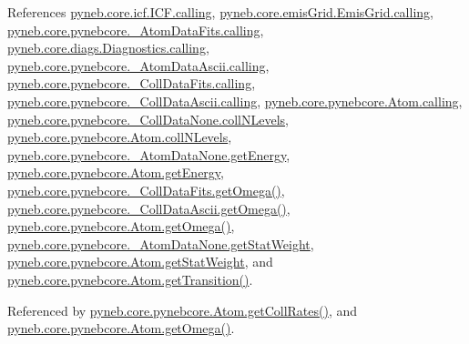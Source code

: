References \hyperlink{icf_8py_source_l00016}{pyneb.\+core.\+icf.\+I\+C\+F.\+calling}, \hyperlink{emis_grid_8py_source_l00041}{pyneb.\+core.\+emis\+Grid.\+Emis\+Grid.\+calling}, \hyperlink{pynebcore_8py_source_l00090}{pyneb.\+core.\+pynebcore.\+\_\+\+Atom\+Data\+Fits.\+calling}, \hyperlink{diags_8py_source_l00169}{pyneb.\+core.\+diags.\+Diagnostics.\+calling}, \hyperlink{pynebcore_8py_source_l00311}{pyneb.\+core.\+pynebcore.\+\_\+\+Atom\+Data\+Ascii.\+calling}, \hyperlink{pynebcore_8py_source_l00568}{pyneb.\+core.\+pynebcore.\+\_\+\+Coll\+Data\+Fits.\+calling}, \hyperlink{pynebcore_8py_source_l00918}{pyneb.\+core.\+pynebcore.\+\_\+\+Coll\+Data\+Ascii.\+calling}, \hyperlink{pynebcore_8py_source_l01175}{pyneb.\+core.\+pynebcore.\+Atom.\+calling}, \hyperlink{pynebcore_8py_source_l00073}{pyneb.\+core.\+pynebcore.\+\_\+\+Coll\+Data\+None.\+coll\+N\+Levels}, \hyperlink{pynebcore_8py_source_l01253}{pyneb.\+core.\+pynebcore.\+Atom.\+coll\+N\+Levels}, \hyperlink{pynebcore_8py_source_l00059}{pyneb.\+core.\+pynebcore.\+\_\+\+Atom\+Data\+None.\+get\+Energy}, \hyperlink{pynebcore_8py_source_l01200}{pyneb.\+core.\+pynebcore.\+Atom.\+get\+Energy}, \hyperlink{pynebcore_8py_source_l00811}{pyneb.\+core.\+pynebcore.\+\_\+\+Coll\+Data\+Fits.\+get\+Omega()}, \hyperlink{pynebcore_8py_source_l01063}{pyneb.\+core.\+pynebcore.\+\_\+\+Coll\+Data\+Ascii.\+get\+Omega()}, \hyperlink{pynebcore_8py_source_l01262}{pyneb.\+core.\+pynebcore.\+Atom.\+get\+Omega()}, \hyperlink{pynebcore_8py_source_l00058}{pyneb.\+core.\+pynebcore.\+\_\+\+Atom\+Data\+None.\+get\+Stat\+Weight}, \hyperlink{pynebcore_8py_source_l01199}{pyneb.\+core.\+pynebcore.\+Atom.\+get\+Stat\+Weight}, and \hyperlink{pynebcore_8py_source_l01406}{pyneb.\+core.\+pynebcore.\+Atom.\+get\+Transition()}.



Referenced by \hyperlink{pynebcore_8py_source_l01329}{pyneb.\+core.\+pynebcore.\+Atom.\+get\+Coll\+Rates()}, and \hyperlink{pynebcore_8py_source_l01262}{pyneb.\+core.\+pynebcore.\+Atom.\+get\+Omega()}.


